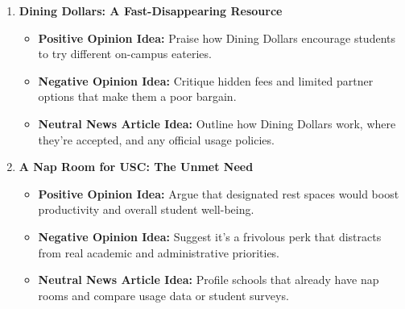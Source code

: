 \documentclass{article}
\begin{document}
\begin{enumerate}
    \item \textbf{Dining Dollars: A Fast-Disappearing Resource}
    \begin{itemize}
        \item \textbf{Positive Opinion Idea:} Praise how Dining Dollars encourage students to try different on-campus eateries.
        \item \textbf{Negative Opinion Idea:} Critique hidden fees and limited partner options that make them a poor bargain.
        \item \textbf{Neutral News Article Idea:} Outline how Dining Dollars work, where they’re accepted, and any official usage policies.
    \end{itemize}

    \item \textbf{A Nap Room for USC: The Unmet Need}
    \begin{itemize}
        \item \textbf{Positive Opinion Idea:} Argue that designated rest spaces would boost productivity and overall student well-being.
        \item \textbf{Negative Opinion Idea:} Suggest it’s a frivolous perk that distracts from real academic and administrative priorities.
        \item \textbf{Neutral News Article Idea:} Profile schools that already have nap rooms and compare usage data or student surveys.
    \end{itemize}
\end{enumerate}
\end{document}
